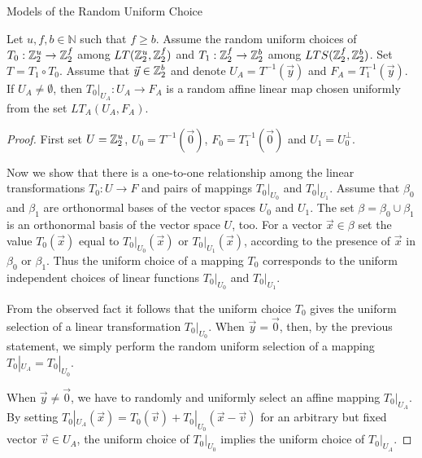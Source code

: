 \begin{section}{Models of the Random Uniform Choice}
\begin{remark}
\label{remark-model-uniform-linear-map-selection-affine}
Let $u, f, b \in \mathbb{N}$ such that $f \geq b$. Assume the random uniform choices of $T_0:\mathbb{Z}_{2}^{u} \rightarrow \mathbb{Z}_{2}^{f}$ among $LT(\mathbb{Z}_{2}^{u}, \mathbb{Z}_{2}^{f})$ and $T_1: \mathbb{Z}_{2}^{f} \rightarrow \mathbb{Z}_{2}^{b}$ among $LTS(\mathbb{Z}_{2}^{f}, \mathbb{Z}_{2}^{b})$. Set $T = T_1 \circ T_0$. Assume that $\vec{y} \in \mathbb{Z}_{2}^{b}$ and denote $U_A = T ^ {-1}(\vec{y})$ and $F_A = T_1 ^ {-1}(\vec{y})$. If $U_A \neq \emptyset$, then $T_0|_{U_A}: U_A \rightarrow F_A$ is a random affine linear map chosen uniformly from the set $LT_{A}(U_A, F_A)$.
\end{remark}
\begin{proof}
First set $U = \mathbb{Z}_{2}^{u}$, $U_0 = T^{-1}(\vec{0})$, $F_0 = T_1^{-1}(\vec{0})$ and $U_1 = U_0 ^ {\bot}$. 

Now we show that there is a one-to-one relationship among the linear transformations $T_0: U \rightarrow F$ and pairs of mappings $T_0|_{U_0}$ and $T_0|_{U_1}$. Assume that $\beta_0$ and $\beta_1$ are orthonormal bases of the vector spaces $U_0$ and $U_1$. The set $\beta = \beta_0 \cup \beta_1$ is an orthonormal basis of the vector space $U$, too. For a vector $\vec{x} \in \beta$ set the value $T_0(\vec{x})$ equal to $T_0|_{U_0}(\vec{x})$ or $T_0|_{U_1}(\vec{x})$, according to the presence of $\vec{x}$ in $\beta_0$ or $\beta_1$. Thus the uniform choice of a mapping $T_0$ corresponds to the uniform independent choices of linear functions $T_0|_{U_0}$ and $T_0|_{U_1}$.

From the observed fact it follows that the uniform choice $T_0$ gives the uniform selection of a linear transformation $T_0|_{U_0}$. When $\vec{y} = \vec{0}$, then, by the previous statement, we simply perform the random uniform selection of a mapping $T_0|_{U_A} = T_0|_{U_0}$. 

When $\vec{y} \neq \vec{0}$, we have to randomly and uniformly select an affine mapping $T_0|_{U_A}$. By setting $T_0|_{U_A}(\vec{x}) = T_0(\vec{v}) + T_0|_{U_0}(\vec{x} - \vec{v})$ for an arbitrary but fixed vector $\vec{v} \in U_A$, the uniform choice of $T_0|_{U_0}$ implies the uniform choice of $T_0|_{U_A}$.
\end{proof}
\end{section}
